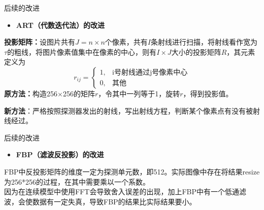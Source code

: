 \documentclass{beamer} %
\begin{document}
	\begin{frame}{后续的改进}
		\begin{itemize}
			\item \textbf{ART（代数迭代法）的改进}
		\end{itemize}
		\small \textbf{投影矩阵：}设图片共有\(J = n\times n\)个像素，共有$I$条射线进行扫描，将射线看作宽为\(\tau\)的粗线，将图片像素值集中在像素的中心，则有\(I\times J\)大小的投影矩阵$R$，其元素定义为
		\[r_{ij}=
		\begin{cases}
		1 ,& \text{i号射线通过j号像素中心}\\
		0 ,& \text{其他}
		\end{cases}\]
		\textbf{原方法：}构造256$\times$256的矩阵$r$，令其中一列等于1，旋转$r$，得到投影值。

		\textbf{新方法}：严格按照探测器发出的射线，写出射线方程，判断某个像素点有没有被射线经过。
	\end{frame}

	\begin{frame}{后续的改进}
		\begin{itemize}
			\item \textbf{FBP（滤波反投影）的改进}
		\end{itemize}
		\small FBP中反投影矩阵的维度一定为探测单元数，即512。实际图像中存在将结果resize为256*256的过程，在其中需要乘以一个系数。\\
		因为在连续模型中使用FFT会导致舍入误差的出现，加上FBP中有一个低通滤波，会使数据有一定失真，导致FBP的结果比实际结果要小。
	\end{frame}
\end{document}
